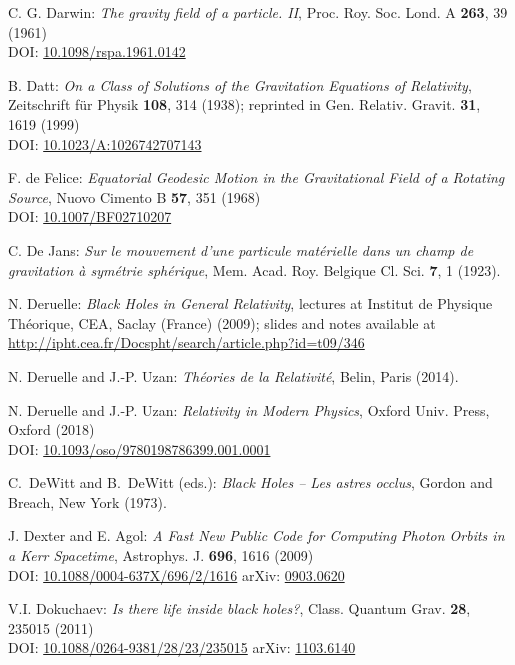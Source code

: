 \begin{thebibliography}{123}
C. G. Darwin: {\em The gravity field of a particle. II},
Proc. Roy. Soc. Lond. A {\bf 263}, 39 (1961)\\
DOI: \href{https://doi.org/10.1098/rspa.1961.0142}{10.1098/rspa.1961.0142}

B. Datt:
{\em On a Class of Solutions of the Gravitation Equations of Relativity},
Zeitschrift für Physik {\bf 108}, 314 (1938);
reprinted in Gen. Relativ. Gravit. {\bf 31}, 1619 (1999)\\
DOI: \href{https://doi.org/10.1023/A:1026742707143}{10.1023/A:1026742707143}

F. de Felice:
{\em Equatorial Geodesic Motion in the Gravitational Field of a Rotating Source},
Nuovo Cimento B {\bf 57}, 351 (1968)\\
DOI: \href{https://doi.org/10.1007/BF02710207}{10.1007/BF02710207}

C. De Jans:
\emph{Sur le mouvement d'une particule matérielle dans un champ de gravitation à symétrie sphérique},
Mem. Acad. Roy. Belgique Cl. Sci. {\bf 7}, 1 (1923).

N. Deruelle: {\em Black Holes in General Relativity}, lectures at
Institut de Physique Théorique, CEA, Saclay (France) (2009); slides and notes
available at \\
\url{http://ipht.cea.fr/Docspht/search/article.php?id=t09/346}

N. Deruelle and J.-P. Uzan: {\em Th\'eories de la Relativit\'e},
Belin, Paris (2014).

N. Deruelle and J.-P. Uzan: {\em Relativity in Modern Physics},
Oxford Univ. Press, Oxford (2018)\\
DOI: \href{https://doi.org/10.1093/oso/9780198786399.001.0001}{10.1093/oso/9780198786399.001.0001}

C.~DeWitt and B.~DeWitt (eds.):
{\em Black Holes -- Les astres occlus},
Gordon and Breach, New York (1973).

J. Dexter and E. Agol:
{\em A Fast New Public Code for Computing Photon Orbits in a Kerr Spacetime},
Astrophys. J. {\bf 696}, 1616 (2009)\\
DOI: \href{https://doi.org/10.1088/0004-637X/696/2/1616}{10.1088/0004-637X/696/2/1616}\hfill
arXiv: \href{https://arxiv.org/abs/0903.0620}{0903.0620}

V.I. Dokuchaev: {\em Is there life inside black holes?},
Class. Quantum Grav. {\bf 28}, 235015 (2011)\\
DOI: \href{https://doi.org/10.1088/0264-9381/28/23/235015}{10.1088/0264-9381/28/23/235015}\hfill
arXiv: \href{https://arxiv.org/abs/1103.6140}{1103.6140}


\end{thebibliography}
